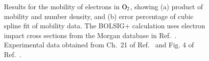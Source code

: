 \documentclass{warpdoc}
\let\citen\cite
\begin{document}
%
\begin{figure}
\centering
{}
\caption{Results for the mobility of electrons in ${\rm O_2}$, showing (a) product of mobility and number density, and (b) error percentage of cubic spline fit of  mobility data. The BOLSIG+ calculation uses electron impact cross sections from the Morgan database in Ref.\ \citen{jcp:2012:morgan}. Experimental data obtained from Ch.\ 21 of Ref.\ \citen{book:1997:grigoriev} and Fig. 4 of Ref.\ \citen{ajp:1973:crompton}.}
\label{fig:mobility_O2}
\end{figure}
\end{document}
